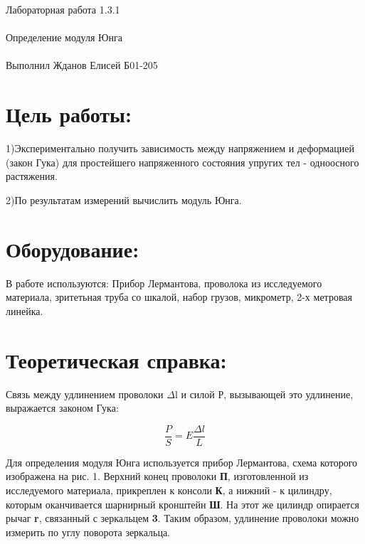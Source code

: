 \documentclass{astroedu-lab}
\begin{document}
\pagestyle{plain}

\begin{problem}{\huge Лабораторная работа 1.3.1\\\\Определение модуля Юнга\\\\Выполнил Жданов Елисей Б01-205}

\section{Цель работы:}

1)Экспериментально получить зависимость между напряжением и деформацией (закон Гука) для простейшего напряженного состояния упругих тел - одноосного растяжения.

2)По результатам измерений вычислить модуль Юнга.

\section{Оборудование:}

В работе используются: Прибор Лермантова, проволока из исследуемого материала, зритетьная труба со шкалой, набор грузов, микрометр, 2-х метровая линейка.

\newpage

\section{Теоретическая справка:}

Связь между удлинением проволоки $\Delta \mathrm{l}$ и силой Р, вызывающей это удлинение, выражается законом Гука:

$$
\boxed{\frac{P}{S}=E \frac{\Delta l}{L}}
$$

Для определения модуля Юнга используется прибор Лермантова, схема которого изображена на рис. 1. Верхний конец проволоки \textbf{П}, изготовленной из исследуемого материала, прикреплен к консоли \textbf{К}, а нижний - к цилиндру, которым оканчивается шарнирный кронштейн \textbf{Ш}. На этот же цилиндр опирается рычаг \textbf{r}, связанный с зеркальцем \textbf{3}. Таким образом, удлинение проволоки можно измерить по углу поворота зеркальца.


\end{problem}
\end{document}
